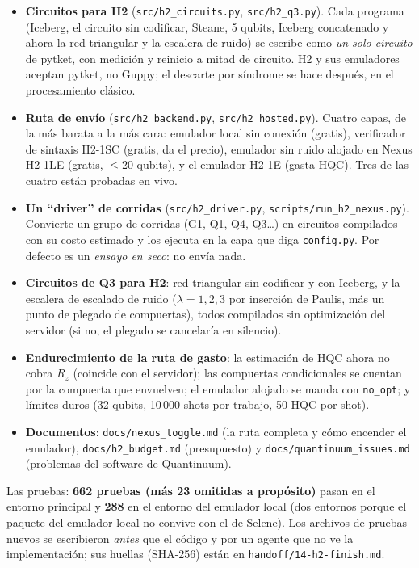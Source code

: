 \documentclass[11pt,a4paper]{article}
\newcommand{\code}[1]{\nolinkurl{#1}}
\begin{document}
\begin{itemize}[leftmargin=1.4em]
  \item \textbf{Circuitos para H2} (\code{src/h2_circuits.py}, \code{src/h2_q3.py}). Cada programa
    (Iceberg, el circuito sin codificar, Steane, 5 qubits, Iceberg concatenado y ahora la red triangular
    y la escalera de ruido) se escribe como \emph{un solo circuito} de pytket, con medici\'on y reinicio
    a mitad de circuito. H2 y sus emuladores aceptan pytket, no Guppy; el descarte por s\'indrome se hace
    despu\'es, en el procesamiento cl\'asico.
  \item \textbf{Ruta de env\'io} (\code{src/h2_backend.py}, \code{src/h2_hosted.py}). Cuatro capas, de la m\'as
    barata a la m\'as cara: emulador local sin conexi\'on (gratis), verificador de sintaxis H2-1SC (gratis, da
    el precio), emulador sin ruido alojado en Nexus H2-1LE (gratis, $\le$20 qubits), y el emulador H2-1E
    (gasta HQC). Tres de las cuatro est\'an probadas en vivo.
  \item \textbf{Un ``driver'' de corridas} (\code{src/h2_driver.py}, \code{scripts/run_h2_nexus.py}).
    Convierte un grupo de corridas (G1, Q1, Q4, Q3\ldots) en circuitos compilados con su costo estimado y los
    ejecuta en la capa que diga \texttt{config.py}. Por defecto es un \emph{ensayo en seco}: no env\'ia nada.
  \item \textbf{Circuitos de Q3 para H2}: red triangular sin codificar y con Iceberg, y la escalera de
    escalado de ruido ($\lambda=1,2,3$ por inserci\'on de Paulis, m\'as un punto de plegado de compuertas),
    todos compilados sin optimizaci\'on del servidor (si no, el plegado se cancelar\'ia en silencio).
  \item \textbf{Endurecimiento de la ruta de gasto}: la estimaci\'on de HQC ahora no cobra $R_z$
    (coincide con el servidor); las compuertas condicionales se cuentan por la compuerta que envuelven;
    el emulador alojado se manda con \texttt{no\_opt}; y l\'imites duros (32 qubits, 10\,000 shots por
    trabajo, 50 HQC por shot).
  \item \textbf{Documentos}: \code{docs/nexus_toggle.md} (la ruta completa y c\'omo encender el emulador),
    \code{docs/h2_budget.md} (presupuesto) y \code{docs/quantinuum_issues.md} (problemas del software de
    Quantinuum).
\end{itemize}

Las pruebas: \textbf{662 pruebas (m\'as 23 omitidas a prop\'osito)} pasan en el entorno principal y \textbf{288} en el entorno del emulador local
(dos entornos porque el paquete del emulador local no convive con el de Selene). Los archivos de pruebas
nuevos se escribieron \emph{antes} que el c\'odigo y por un agente que no ve la implementaci\'on; sus huellas
(SHA-256) est\'an en \code{handoff/14-h2-finish.md}.
\end{document}
